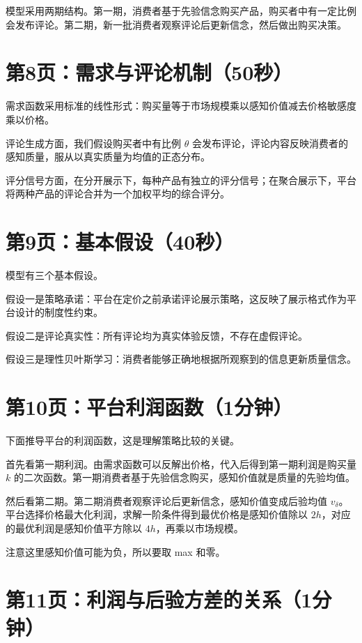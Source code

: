 \documentclass[12pt,a4paper]{article}
\begin{document}
模型采用两期结构。第一期，消费者基于先验信念购买产品，购买者中有一定比例会发布评论。第二期，新一批消费者观察评论后更新信念，然后做出购买决策。

\section*{第8页：需求与评论机制（50秒）}

需求函数采用标准的线性形式：购买量等于市场规模乘以感知价值减去价格敏感度乘以价格。

评论生成方面，我们假设购买者中有比例 $\theta$ 会发布评论，评论内容反映消费者的感知质量，服从以真实质量为均值的正态分布。

评分信号方面，在分开展示下，每种产品有独立的评分信号；在聚合展示下，平台将两种产品的评论合并为一个加权平均的综合评分。

\section*{第9页：基本假设（40秒）}

模型有三个基本假设。

假设一是策略承诺：平台在定价之前承诺评论展示策略，这反映了展示格式作为平台设计的制度性约束。

假设二是评论真实性：所有评论均为真实体验反馈，不存在虚假评论。

假设三是理性贝叶斯学习：消费者能够正确地根据所观察到的信息更新质量信念。

\section*{第10页：平台利润函数（1分钟）}

下面推导平台的利润函数，这是理解策略比较的关键。

首先看第一期利润。由需求函数可以反解出价格，代入后得到第一期利润是购买量 $k$ 的二次函数。第一期消费者基于先验信念购买，感知价值就是质量的先验均值。

然后看第二期。第二期消费者观察评论后更新信念，感知价值变成后验均值 $v_\delta$。平台选择价格最大化利润，求解一阶条件得到最优价格是感知价值除以 $2h$，对应的最优利润是感知价值平方除以 $4h$，再乘以市场规模。

注意这里感知价值可能为负，所以要取 max 和零。

\section*{第11页：利润与后验方差的关系（1分钟）}
\end{document}
